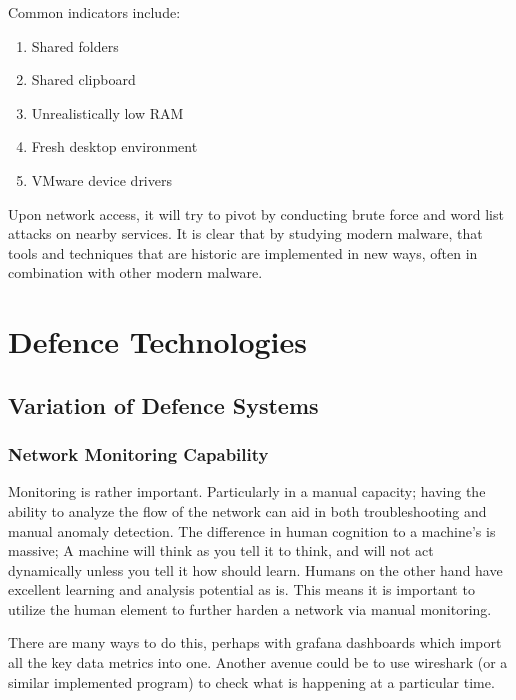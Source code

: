 
Common indicators include:
\begin{enumerate}
    \item Shared folders
    \item Shared clipboard
    \item Unrealistically low RAM
    \item Fresh desktop environment
    \item VMware device drivers
\end{enumerate}

Upon network access, it will try to pivot by conducting brute force and word list attacks on nearby services. It is clear that by studying modern malware, that tools and techniques that are historic are implemented in new ways, often in combination with other modern malware.



\chapter{Defence Technologies}
\section{Variation of Defence Systems}
\subsection{Network Monitoring Capability}
Monitoring is rather important. Particularly in a manual capacity; having the ability to analyze the flow of the network can aid in both troubleshooting and manual anomaly detection. The difference in human cognition to a machine's is massive; A machine will think as you tell it to think,
and will not act dynamically unless you tell it how should learn. Humans on the other hand have excellent learning and analysis potential as is. This means it is important to utilize the human element to further harden a network via manual monitoring. 

There are many ways to do this, perhaps with grafana dashboards which import all the key data metrics into one. Another avenue could be to use wireshark (or a similar implemented program) to check what is happening at a particular time. 

